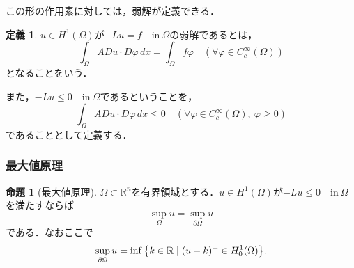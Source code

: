 \documentclass[a4paper]{ltjsarticle}
\newcommand{\Rset}{\mathbb{R}}
\newcommand{\Om}{\Omega}
\newcommand{\pOm}{\partial\Omega}
\newcommand{\inn}{\quad\text{in}\ }
\newcommand{\1}{\mathbbm{1}}
\numberwithin{equation}{section}
\theoremstyle{definition}
\newtheorem{dfn}[thm]{定義}
\newtheorem{prop}[thm]{命題}
\begin{document}
この形の作用素に対しては，弱解が定義できる．
\begin{dfn}
    $u\in H^1(\Om)$が$-Lu=f\inn \Om$の弱解であるとは，
    \begin{equation}
        \int_{\Om}ADu\cdot D\varphi\,dx=\int_{\Om}f\varphi\quad (\forall \varphi\in C^{\infty}_c(\Om))
    \end{equation}
    となることをいう．

    また，$-Lu\leq 0\inn\Om$であるということを，
    \begin{equation}
        \int_{\Om}ADu\cdot D\varphi\,dx\leq 0\quad (\forall \varphi\in C^{\infty}_{c}(\Om),\ \varphi\geq0)
    \end{equation}
    であることとして定義する．
\end{dfn}
\subsubsection{最大値原理}
\begin{prop}[最大値原理]
    $\Om\subset \Rset^n$を有界領域とする．$u\in H^1(\Om)$が$-Lu\leq0\inn\Om$を満たすならば
    \begin{equation}
        \sup_{\Om}u=\sup_{\pOm}u 
    \end{equation}
    である．なおここで
    \begin{equation}
        \sup_{\pOm }u=\inf\qty{k\in\Rset\mid (u-k)^{+}\in H^{1}_0(\Om)}.
    \end{equation}
\end{prop}
\end{document}
